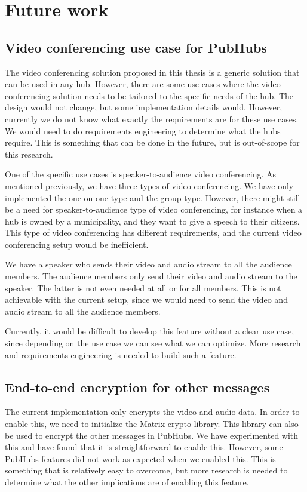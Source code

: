 \documentclass{report}
\begin{document}
\chapter{Future work}
\section{Video conferencing use case for PubHubs}
The video conferencing solution proposed in this thesis is a generic solution that can be used in any hub. However,
there are some use cases where the video conferencing solution needs to be tailored to the specific needs of the hub.
The design would not change, but some implementation details would. However, currently we do not know what exactly the
requirements are for these use cases. We would need to do requirements engineering to determine what the hubs require.
This is something that can be done in the future, but is out-of-scope for this research.

One of the specific use cases is speaker-to-audience video conferencing. As mentioned previously, we have three
types of video conferencing. We have only implemented the one-on-one type and the group type. However, there might
still be a need for speaker-to-audience type of video conferencing, for instance when a hub is owned by a
municipality, and they want to give a speech to their citizens. This type of video conferencing has different
requirements, and the current video conferencing setup would be inefficient.

We have a speaker who sends their video and audio stream to all the audience members. The audience members only send
their video and audio stream to the speaker. The latter is not even needed at all or for all members. This is not
achievable with the current setup, since we would need to send the video and audio stream to all the audience members.

Currently, it would be difficult to develop this feature without a clear use case, since depending on the use case we can
see what we can optimize. More research and requirements engineering is needed to build such a feature.

\section{End-to-end encryption for other messages}\label{sec:encryption_of_messages}
The current implementation only encrypts the video and audio data. In order to enable this, we need to initialize the
Matrix crypto library. This library can also be used to encrypt the other messages in PubHubs. We have experimented
with this and have found that it is straightforward to enable this. However, some PubHubs features did not work as expected
when we enabled this. This is something that is relatively easy to overcome, but more research is needed to determine
what the other implications are of enabling this feature.
\end{document}

